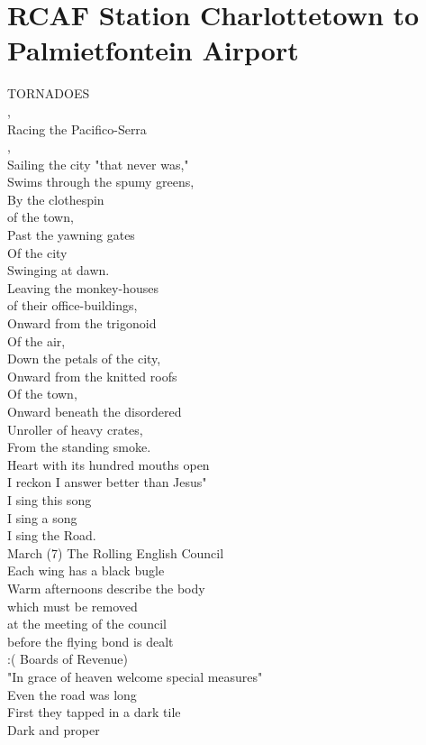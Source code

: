 \documentclass[smalldemyvopaper,11pt,twoside,onecolumn,openright,extrafontsizes]{memoir}
\begin{document}
\chapter{RCAF Station Charlottetown to Palmietfontein Airport}
TORNADOES
\\,
\\Racing the Pacifico-Serra
\\,
\\Sailing the city "that never was,"
\\Swims through the spumy greens,
\\By the clothespin
\\of the town,
\\Past the yawning gates
\\Of the city
\\Swinging at dawn.
\\Leaving the monkey-houses
\\of their office-buildings,
\\Onward from the trigonoid
\\Of the air,
\\Down the petals of the city,
\\Onward from the knitted roofs
\\Of the town,
\\Onward beneath the disordered
\\Unroller of heavy crates,
\\From the standing smoke.
\\Heart with its hundred mouths open
\\I reckon I answer better than Jesus"
\\I sing this song
\\I sing a song
\\I sing the Road.
\\March (7)  The Rolling English Council
\\Each wing has a black bugle
\\Warm afternoons describe the body
\\which must be removed
\\at the meeting of the council
\\before the flying bond is dealt
\\:( Boards of Revenue)
\\"In grace of heaven welcome special measures"
\\Even the road was long
\\First they tapped in a dark tile
\\Dark and proper
\end{document}
